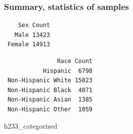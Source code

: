 \documentclass[
]{apa7}
\newenvironment{Shaded}{\begin{snugshade}}{\end{snugshade}}
\newcommand{\AttributeTok}[1]{\textcolor[rgb]{0.40,0.45,0.13}{#1}}
\newcommand{\ConstantTok}[1]{\textcolor[rgb]{0.56,0.35,0.01}{#1}}
\newcommand{\FunctionTok}[1]{\textcolor[rgb]{0.28,0.35,0.67}{#1}}
\newcommand{\NormalTok}[1]{\textcolor[rgb]{0.00,0.23,0.31}{#1}}
\newcommand{\OtherTok}[1]{\textcolor[rgb]{0.00,0.23,0.31}{#1}}
\newcommand{\SpecialCharTok}[1]{\textcolor[rgb]{0.37,0.37,0.37}{#1}}
\newcommand{\StringTok}[1]{\textcolor[rgb]{0.13,0.47,0.30}{#1}}
\begin{document}
\subsubsection{Summary, statistics of
samples}\label{summary-statistics-of-samples}

\begin{Shaded}
\end{Shaded}

\begin{verbatim}
    Sex Count
   Male 13423
 Female 14913
\end{verbatim}

\begin{Shaded}
\end{Shaded}

\begin{verbatim}
               Race Count
           Hispanic  6798
 Non-Hispanic White 15023
 Non-Hispanic Black  4071
 Non-Hispanic Asian  1385
 Non-Hispanic Other  1059
\end{verbatim}

\begin{Shaded}
\begin{Highlighting}[]
\NormalTok{h233\_categorized}
\end{Highlighting}
\end{Shaded}
\end{document}
